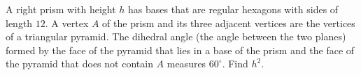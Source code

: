 A right prism with height $h$ has bases that are regular hexagons with sides of length $12$. A vertex $A$ of the prism and its three adjacent vertices are the vertices of a triangular pyramid. The dihedral angle (the angle between the two planes) formed by the face of the pyramid that lies in a base of the prism and the face of the pyramid that does not contain $A$ measures $60^\circ$. Find $h^2$.